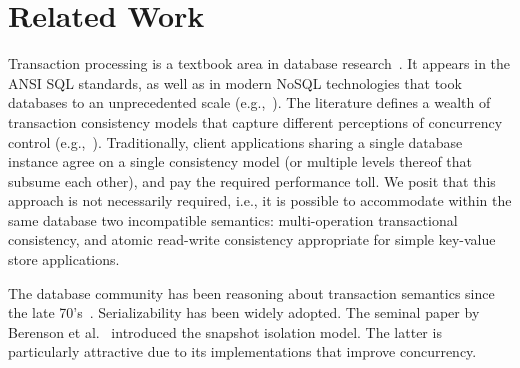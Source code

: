 
\section{Related Work}
\label{sec:related}

Transaction processing is a textbook area in database research~\cite{WeikumTIS2001,GrayTP1993}.
It appears in the ANSI SQL standards, 
as well as in modern NoSQL technologies that took databases to an unprecedented
scale (e.g.,~\cite{Percolator2010}). The literature defines a wealth of transaction 
consistency models that capture different perceptions of concurrency control 
(e.g.,~\cite{Papadimitriou1979, Berenson1995}). Traditionally, client applications 
sharing a single database instance agree on a single consistency model (or multiple 
levels thereof that subsume each other), and pay the required performance toll. 
We posit that this approach is not necessarily required, i.e., it is possible 
to accommodate within the same database two incompatible semantics: 
multi-operation transactional consistency, and atomic read-write consistency
appropriate for simple key-value store applications. 

The database community has been reasoning about transaction semantics since the late 
70's~\cite{Papadimitriou1979}. Serializability %
has been widely adopted.
The seminal paper by Berenson et al.~\cite{Berenson1995} %
introduced the snapshot isolation model. The latter is particularly attractive due to its 
implementations that improve concurrency. 
%

